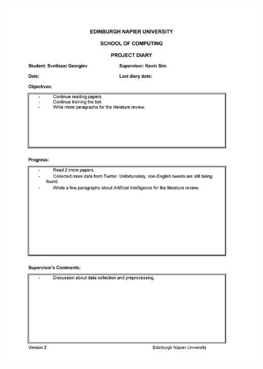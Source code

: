 \documentclass[12pt,a4paper]{article}
\begin{document}
\begin{appendices}
\includegraphics[width=\textwidth,height=\textheight,keepaspectratio]{diary5.png} 
\newpage

\end{appendices}
\end{document}
